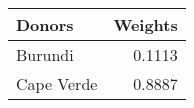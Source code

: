\begin{tabular}{lr}
\toprule
    Donors &  Weights \\
\midrule
   Burundi &   0.1113 \\
Cape Verde &   0.8887 \\
\bottomrule
\end{tabular}
